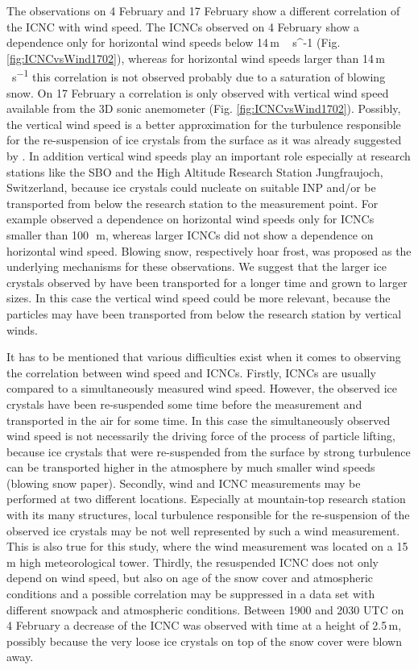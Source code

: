 \documentclass[draft,linenumbers]{agujournal}
\begin{document}
The observations on 4 February and 17 February show a different correlation of the ICNC with wind speed. The ICNCs observed on 4 February show a dependence only for horizontal wind speeds below 14\,\si{m\,{s^{-1}}} (Fig. \ref{fig:ICNCvsWind1702}), whereas for horizontal wind speeds larger than 14\,\si{m\,s^{-1}} this correlation is not observed probably due to a saturation of blowing snow. On 17 February a correlation is only observed with vertical wind speed available from the 3D sonic anemometer (Fig. \ref{fig:ICNCvsWind1702}). Possibly, the vertical wind speed is a better approximation for the turbulence responsible for the re-suspension of ice crystals from the surface as it was already suggested by \citet{Ham14}. In addition vertical wind speeds play an important role especially at research stations like the SBO and the High Altitude Research Station Jungfraujoch, Switzerland, because ice crystals could nucleate on suitable INP and/or be transported from below the research station to the measurement point. For example \citep{Loy15} observed a dependence on horizontal wind speeds only for ICNCs smaller than 100\,\si{\mu m}, whereas larger ICNCs did not show a dependence on horizontal wind speed. Blowing snow, respectively hoar frost, was proposed as the underlying mechanisms for these observations. We suggest that the larger ice crystals observed by \citet{Loy15} have been transported for a longer time and grown to larger sizes. In this case the vertical wind speed could be more relevant, because the particles may have been transported from below the research station by vertical winds.

It has to be mentioned that various difficulties exist when it comes to observing the correlation between wind speed and ICNCs. Firstly, ICNCs are usually compared to a simultaneously measured wind speed. However, the observed ice crystals have been re-suspended some time before the measurement and transported in the air for some time. In this case the simultaneously observed wind speed is not necessarily the driving force of the process of particle lifting, because ice crystals that were re-suspended from the surface by strong turbulence can be transported higher in the atmosphere by much smaller wind speeds (blowing snow paper). Secondly, wind and ICNC measurements may be performed at two different locations. Especially at mountain-top research station with its many structures, local turbulence responsible for the re-suspension of the observed ice crystals may be not well represented by such a wind measurement. This is also true for this study, where the wind measurement was located on a 15\,\si{m} high meteorological tower. Thirdly, the resuspended ICNC does not only depend on wind speed, but also on age of the snow cover and atmospheric conditions and a possible correlation may be suppressed in a data set with different snowpack and atmospheric conditions. Between 1900 and 2030 UTC on 4 February a decrease of the ICNC was observed with time at a height of 2.5\,\si{m}, possibly because the very loose ice crystals on top of the snow cover were blown away.
\end{document}
